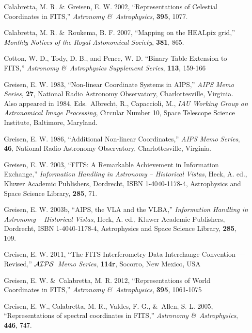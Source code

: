 \documentclass[twoside]{article}
\newcommand{\AIPS}{{$\cal AIPS\/$}}
\begin{document}
\begin{thebibliography}{99}

   Calabretta, M. R. \&\ Greisen, E. W. 2002, ``Representations of
   Celestial Coordinates in FITS,'' {\it Astronomy \&\ Astrophysics},
   {\bf 395}, 1077.

   Calabretta, M. R. \&\ Roukema, B. F. 2007, ``Mapping on the HEALpix
   grid,'' {\it Monthly Notices of the Royal Astonomical Society},
   {\bf 381}, 865.

  Cotton, W. D., Tody, D. B., and Pence, W. D. ``Binary Table
  Extension to FITS,'' {\it Astronomy \&\ Astrophysics Supplement
  Series}, {\bf 113}, 159-166

   Greisen, E. W. 1983, ``Non-linear Coordinate Systems in AIPS,''
   {\it AIPS Memo Series}, {\bf 27}, National Radio Astronomy
   Observatory, Charlottesville, Virginia.  Also appeared in 1984,
   Eds.~Albrecht, R., Capaccioli, M., {\it IAU Working Group on
     Astronomical Image Processing}, Circular Number 10, Space
   Telescope Science Institute, Baltimore, Maryland.

   Greisen, E. W. 1986, ``Additional Non-linear Coordinates,'' {\it
     AIPS Memo Series}, {\bf 46}, National Radio Astronomy
   Observatory, Charlottesville, Virginia.

   Greisen, E. W. 2003, ``FITS: A Remarkable Achievement in
   Information Exchange,'' {\it Information Handling in Astronomy --
     Historical Vistas}, Heck, A. ed., Kluwer Academic Publishers,
   Dordrecht, ISBN 1-4040-1178-4, Astrophysics and Space Science
   Library, {\bf 285}, 71.

   Greisen, E. W. 2003b, ``AIPS, the VLA and the VLBA,'' {\it
     Information Handling in Astronomy -- Historical Vistas}, Heck, A.
   ed., Kluwer Academic Publishers, Dordrecht, ISBN 1-4040-1178-4,
   Astrophysics and Space Science Library, {\bf 285}, 109.

   Greisen, E. W. 2011, ``The FITS Interferometry Data Interchange
   Convention --- Revised,'' {\it \AIPS\ Memo Series}, {\bf 114r},
   Socorro, New Mexico, USA

   Greisen, E. W. \&\ Calabretta, M. R. 2012, ``Representations of
   World Coordinates in FITS,'' {\it Astronomy \&\ Astrophysics}, {\bf
     395}, 1061-1075

   Greisen, E. W., Calabretta, M. R., Valdes, F. G., \&\ Allen, S. L.
   2005, ``Representations of spectral coordinates in FITS,'' {\it
     Astronomy \&\ Astrophysics}, {\bf 446}, 747.


\end{thebibliography}
\end{document}
